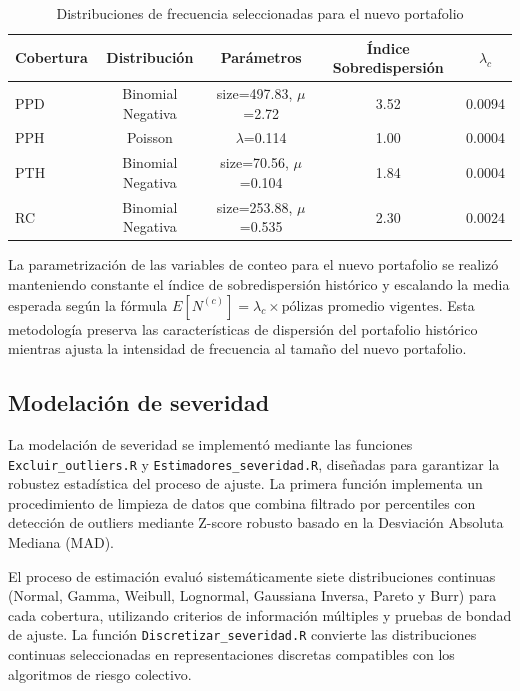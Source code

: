 \begin{table}[H]
\centering
\caption{Distribuciones de frecuencia seleccionadas para el nuevo portafolio}
\begin{tabular}{lcccc}
\hline
\textbf{Cobertura} & \textbf{Distribución} & \textbf{Parámetros} & \textbf{Índice Sobredispersión} & \textbf{$\lambda_c$} \\
\hline
PPD & Binomial Negativa & size=497.83, $\mu$=2.72 & 3.52 & 0.0094 \\
PPH & Poisson & $\lambda$=0.114 & 1.00 & 0.0004 \\
PTH & Binomial Negativa & size=70.56, $\mu$=0.104 & 1.84 & 0.0004 \\
RC & Binomial Negativa & size=253.88, $\mu$=0.535 & 2.30 & 0.0024 \\
\hline
\end{tabular}
\end{table}

La parametrización de las variables de conteo para el nuevo portafolio se realizó manteniendo constante el índice de sobredispersión histórico y escalando la media esperada según la fórmula $E[N^{(c)}] = \lambda_c \times \text{pólizas promedio vigentes}$. Esta metodología preserva las características de dispersión del portafolio histórico mientras ajusta la intensidad de frecuencia al tamaño del nuevo portafolio.


\subsection{Modelación de severidad}

La modelación de severidad se implementó mediante las funciones \texttt{Excluir\_outliers.R} y \texttt{Estimadores\_severidad.R}, diseñadas para garantizar la robustez estadística del proceso de ajuste. La primera función implementa un procedimiento de limpieza de datos que combina filtrado por percentiles con detección de outliers mediante Z-score robusto basado en la Desviación Absoluta Mediana (MAD).

El proceso de estimación evaluó sistemáticamente siete distribuciones continuas (Normal, Gamma, Weibull, Lognormal, Gaussiana Inversa, Pareto y Burr) para cada cobertura, utilizando criterios de información múltiples y pruebas de bondad de ajuste. La función \texttt{Discretizar\_severidad.R} convierte las distribuciones continuas seleccionadas en representaciones discretas compatibles con los algoritmos de riesgo colectivo.

